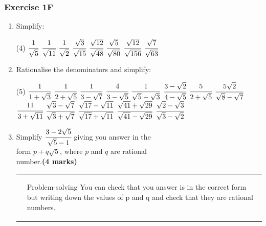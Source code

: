 \documentclass[fleqn]{article}
\newcommand{\exercise}{\subsubsection}
\begin{document}
\exercise{Exercise 1F}
\begin{enumerate}
	\item Simplify:
		\begin{tasks}(4) %
			\task $\cfrac{1}{\sqrt{5}}$					%
			\task $\cfrac{1}{\sqrt{11}}$					%
			\task $\cfrac{1}{\sqrt{2}}$					%
			\task $\cfrac{\sqrt{3}}{\sqrt{15}}$			%
			\task $\cfrac{\sqrt{12}}{\sqrt{48}}$			%
			\task $\cfrac{\sqrt{5}}{\sqrt{80}}$			%
			\task $\cfrac{\sqrt{12}}{\sqrt{156}}$		%
			\task $\cfrac{\sqrt{7}}{\sqrt{63}}$			%
		\end{tasks}
	\item Rationalise the denominators and simplify:
		\begin{tasks}(5) %
			\task $\cfrac{1}{1+\sqrt{3}}$								%
			\task $\cfrac{1}{2+\sqrt{5}}$								%
			\task $\cfrac{1}{3-\sqrt{7}}$								%
			\task $\cfrac{4}{3-\sqrt{5}}$								%
			\task $\cfrac{1}{\sqrt{5}-\sqrt{3}}$							%
			\task $\cfrac{3-\sqrt{2}}{4-\sqrt{5}}$						%
			\task $\cfrac{5}{2+\sqrt{5}}$								%
			\task $\cfrac{5\sqrt{2}}{\sqrt{8}-\sqrt{7}}$					%
			\task $\cfrac{11}{3+\sqrt{11}}$								%
			\task $\cfrac{\sqrt{3}-\sqrt{7}}{\sqrt{3}+\sqrt{7}}$			%
			\task $\cfrac{\sqrt{17}-\sqrt{11}}{\sqrt{17}+\sqrt{11}}$		%
			\task $\cfrac{\sqrt{41}+\sqrt{29}}{\sqrt{41}-\sqrt{29}}$		%
			\task $\cfrac{\sqrt{2}-\sqrt{3}}{\sqrt{3}-\sqrt{2}}$			%
		\end{tasks}
	\setcounter{enumi}{3}
	\newpage
	\item Simplify $\cfrac{3-2\sqrt{5}}{\sqrt{5}-1}$	 giving you answer in the	\\ %
		  \indent form $p+q\sqrt{5}$, where $p$ and $q$ are rational	 			\\
		  number.\hspace*{40mm}\textbf{(4 marks)}\vspace{-4mm}					\\
		\begin{table}[!ht]
			\begin{tabularx}{\dimexpr\textwidth}{X@{\hskip10pt}p{3.5in}}
				{ } & \vspace{-3cm}\begin{mybox2}[colbacktitle=green]{Problem-solving}
						You can check that you answer is in the correct form but writing down the values of p and q and check that they are rational numbers.
				\end{mybox2}
		    \end{tabularx}
		    \vspace{-10mm}
		\end{table}
\end{enumerate}
\end{document}
